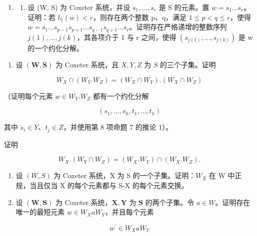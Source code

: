 
\begin{enumerate}
\def\labelenumi{\arabic{enumi})}
\tightlist
\item
  \begin{enumerate}
  \def\labelenumii{\alph{enumii})}
  \tightlist
  \item
    设 (W, S) 为 Coxeter 系统，并设 \(s_{1}, \ldots, s_{r}\) 是 S 的元素。置 \(w = s_{1} \ldots s_{r}\)。证明：若 \(l_{\mathbb{S}}(w) < r\)，则存在两个整数 p、q，满足 \(1 \leqslant p < q \leqslant r\)，使得 \(w = s_{1} \ldots s_{p-1}s_{p+1} \ldots s_{q-1}s_{q+1} \ldots s_{r}\)。证明存在严格递增的整数序列 \(j(1), \ldots, j(k)\)，其各项介于 1 与 r 之间，使得 \((s_{j(1)}, \ldots, s_{j(k)})\) 是 w 的一个约化分解。
  \end{enumerate}
\end{enumerate}

\begin{enumerate}
\def\labelenumi{\alph{enumi})}
\setcounter{enumi}{1}
\tightlist
\item
  设 \((\mathbf{W},\mathbf{S})\) 为 Coxeter 系统，且 \(X,Y,Z\) 为 \(S\) 的三个子集。证明
\end{enumerate}

\[
W _ {X} \cap (W _ {Y}. W _ {Z}) = (W _ {X} \cap W _ {Y}). (W _ {X} \cap W _ {Z})
\]

（证明每个元素 \(w \in W_{Y}.W_{Z}\) 都有一个约化分解

\[
(s _ {1}, \ldots , s _ {h}, t _ {1}, \ldots , t _ {k})
\]

其中 \(s_i \in Y\)、\(t_j \in Z\)，并使用第 8 项命题 7 的推论 1）。

证明

\[
W _ {X}. \left(W _ {Y} \cap W _ {Z}\right) = \left(W _ {X}. W _ {Y}\right) \cap \left(W _ {X}. W _ {Z}\right).
\]

\begin{enumerate}
\def\labelenumi{\arabic{enumi})}
\setcounter{enumi}{1}
\item
  设 \((W,S)\) 为 Coxeter 系统，X 为 S 的一个子集。证明：\(W_{X}\) 在 W 中正规，当且仅当 X 的每个元素都与 S-X 的每个元素交换。
\item
  设 \((\mathbf{W},\mathbf{S})\) 为 Coxeter 系统，\(\mathbf{X},\mathbf{Y}\) 为 \(\mathbf{S}\) 的两个子集。令 \(a\in W\)。证明存在唯一的最短元素 \(w\in W_X a W_Y\)，并且每个元素
\end{enumerate}

\[
w ^ {\prime} \in W _ {X} a W _ {Y}
\]

